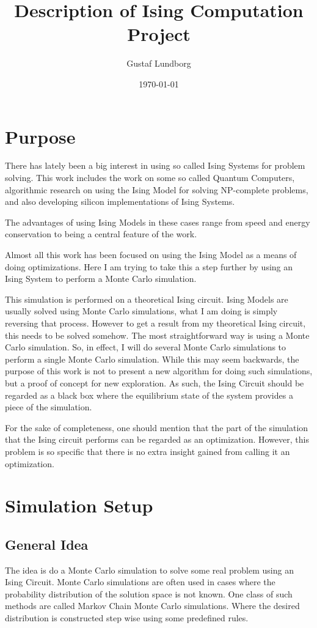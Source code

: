 \documentclass[11pt]{article}
\title{Description of Ising Computation Project}
\author{Gustaf Lundborg}
\date{\today}
\begin{document}
\maketitle
\pagebreak



\section{Purpose}
There has lately been a big interest in using so called Ising Systems for problem solving. This work includes the work on some so called Quantum Computers, algorithmic research on using the Ising Model for solving NP-complete problems, and also developing silicon implementations of Ising Systems.

The advantages of using Ising Models in these cases range from speed and energy conservation to being a central feature of the work.

Almost all this work has been focused on using the Ising Model as a means of doing optimizations. Here I am trying to take this a step further by using an Ising System to perform a Monte Carlo simulation.

This simulation is performed on a theoretical Ising circuit. Ising Models are usually solved using Monte Carlo simulations, what I am doing is simply reversing that process. However to get a result from my theoretical Ising circuit, this needs to be solved somehow. The most straightforward way is using a Monte Carlo simulation. So, in effect, I will do several Monte Carlo simulations to perform a single Monte Carlo simulation. While this may seem backwards, the purpose of this work is not to present a new algorithm for doing such simulations, but a proof of concept for new exploration. As such, the Ising Circuit should be regarded as a black box where the equilibrium state of the system provides a piece of the simulation.

For the sake of completeness, one should mention that the part of the simulation that the Ising circuit performs can be regarded as an optimization. However, this problem is so specific that there is no extra insight gained from calling it an optimization.

\section{Simulation Setup}
\subsection{General Idea}
The idea is do a Monte Carlo simulation to solve some real problem using an Ising Circuit. Monte Carlo simulations are often used in cases where the probability distribution of the solution space is not known. One class of such methods are called Markov Chain Monte Carlo simulations. Where the desired distribution is constructed step wise using some predefined rules.
\end{document}
